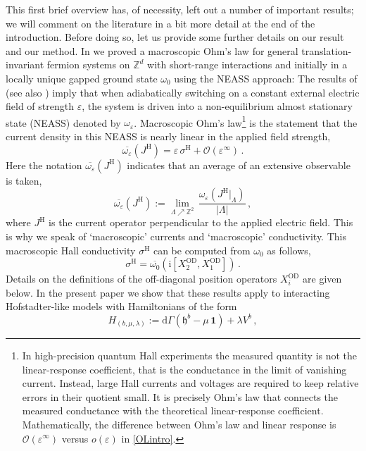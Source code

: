 \documentclass[a4paper]{article}
\renewcommand{\i}{\mathrm{i}}
\newcommand{\epsi}{\varepsilon}
\newcommand{\w}{\omega}
\newcommand{\Z}{\mathbb{Z}}
\newcommand{\OD}[1][]{   ^{\mathrm{OD}#1}   }
\theoremstyle{plain}
\theoremstyle{definition}
\theoremstyle{remark}
\renewcommand{\(}{\left(}
\renewcommand{\)}{\right)}
\begin{document}
This first brief overview has, of necessity, left out a number of important results; we will comment on the literature in a bit more detail at the end of the introduction. Before doing so, let us provide some further details on our result and our method.
In \cite{WMMMT24} we proved a macroscopic Ohm's law for general translation-invariant fermion systems on $\Z^d$ with short-range interactions and initially in a locally unique gapped ground state $\w_0$ using the NEASS approach:
The results of  \cite{BTW26adiabatic} (see also \cite{Teufel2020,HenheikTeufel2022}) imply that 
when adiabatically switching on a constant external electric field of strength $\epsi$, the system is driven into 
 a non-equilibrium almost stationary state (NEASS) denoted by $\w_\epsi$.
Macroscopic Ohm's law\footnote{In high-precision quantum Hall experiments the measured quantity is not the linear-response coefficient, that is the conductance in the limit of vanishing current. Instead, large Hall currents and voltages are required to keep relative errors in their quotient small. 
It is precisely Ohm's law that connects the measured conductance with the theoretical linear-response coefficient.
Mathematically,   the difference between Ohm's law and linear response is $\mathcal{O}(\epsi^\infty)$ versus  $o(\epsi)$ in \eqref{OLintro}.}
is the statement that the current density in this NEASS   is nearly linear in the applied field strength,
\begin{equation}\label{OLintro}
\overline{\w_\epsi}(J^\mathrm{H}) = \epsi\, \sigma^\mathrm{H} + \mathcal{O}(\epsi^\infty)\,.
\end{equation}
Here the notation $\overline{\w_\epsi}(J^\mathrm{H})$ indicates that an average of an extensive observable is taken,
\[
\overline{\w_\epsi}(J^\mathrm{H}) := \lim_{\Lambda\nearrow\Z^2} \,\frac{\w_\epsi(J^\mathrm{H}|_{\Lambda})}{|\Lambda|}\,,
\]
where $J^\mathrm{H}$ is the current operator perpendicular to the applied electric field. This is why we speak of `macroscopic' currents and `macroscopic'  conductivity.
This macroscopic Hall conductivity $\sigma^\mathrm{H}$ can be computed from $\w_0$ as follows, 
\begin{equation}\label{CHintro}
\sigma^\mathrm{H} =\overline{\w_0} \left(\i \left[X_2\OD ,X_1\OD \right]\right) \,. 
\end{equation}
Details on the definitions of the off-diagonal position operators $X_i\OD$ are given below. In the present paper we show that these results apply to   interacting Hofstadter-like models with Hamiltonians of the form
\[
H_{(b,\mu,\lambda)} := \mathrm{d}\Gamma(\mathfrak{h}^b - \mu \, \mathbf{1}) + \lambda V^b\,,
\]
\end{document}

